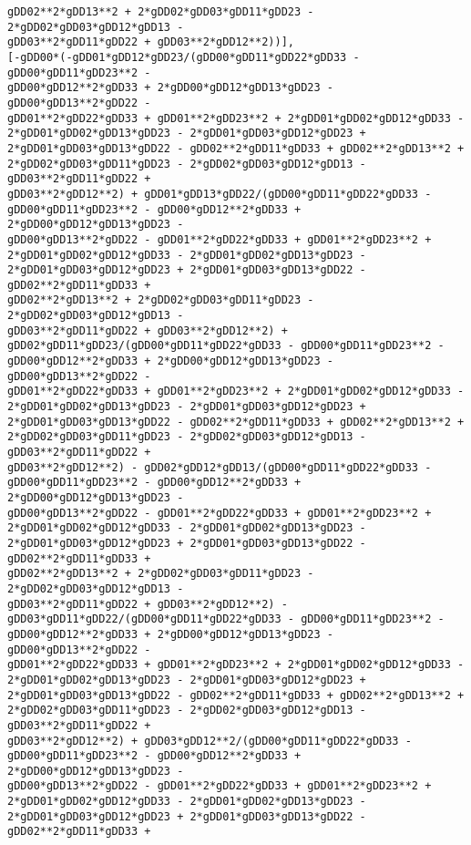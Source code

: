 \documentclass[landscape,letterpaper,10pt,english]{article}
\begin{document}
\begin{Verbatim}[commandchars=\\\{\}]
gDD02**2*gDD13**2 + 2*gDD02*gDD03*gDD11*gDD23 - 2*gDD02*gDD03*gDD12*gDD13 -
gDD03**2*gDD11*gDD22 + gDD03**2*gDD12**2))],
[-gDD00*(-gDD01*gDD12*gDD23/(gDD00*gDD11*gDD22*gDD33 - gDD00*gDD11*gDD23**2 -
gDD00*gDD12**2*gDD33 + 2*gDD00*gDD12*gDD13*gDD23 - gDD00*gDD13**2*gDD22 -
gDD01**2*gDD22*gDD33 + gDD01**2*gDD23**2 + 2*gDD01*gDD02*gDD12*gDD33 -
2*gDD01*gDD02*gDD13*gDD23 - 2*gDD01*gDD03*gDD12*gDD23 +
2*gDD01*gDD03*gDD13*gDD22 - gDD02**2*gDD11*gDD33 + gDD02**2*gDD13**2 +
2*gDD02*gDD03*gDD11*gDD23 - 2*gDD02*gDD03*gDD12*gDD13 - gDD03**2*gDD11*gDD22 +
gDD03**2*gDD12**2) + gDD01*gDD13*gDD22/(gDD00*gDD11*gDD22*gDD33 -
gDD00*gDD11*gDD23**2 - gDD00*gDD12**2*gDD33 + 2*gDD00*gDD12*gDD13*gDD23 -
gDD00*gDD13**2*gDD22 - gDD01**2*gDD22*gDD33 + gDD01**2*gDD23**2 +
2*gDD01*gDD02*gDD12*gDD33 - 2*gDD01*gDD02*gDD13*gDD23 -
2*gDD01*gDD03*gDD12*gDD23 + 2*gDD01*gDD03*gDD13*gDD22 - gDD02**2*gDD11*gDD33 +
gDD02**2*gDD13**2 + 2*gDD02*gDD03*gDD11*gDD23 - 2*gDD02*gDD03*gDD12*gDD13 -
gDD03**2*gDD11*gDD22 + gDD03**2*gDD12**2) +
gDD02*gDD11*gDD23/(gDD00*gDD11*gDD22*gDD33 - gDD00*gDD11*gDD23**2 -
gDD00*gDD12**2*gDD33 + 2*gDD00*gDD12*gDD13*gDD23 - gDD00*gDD13**2*gDD22 -
gDD01**2*gDD22*gDD33 + gDD01**2*gDD23**2 + 2*gDD01*gDD02*gDD12*gDD33 -
2*gDD01*gDD02*gDD13*gDD23 - 2*gDD01*gDD03*gDD12*gDD23 +
2*gDD01*gDD03*gDD13*gDD22 - gDD02**2*gDD11*gDD33 + gDD02**2*gDD13**2 +
2*gDD02*gDD03*gDD11*gDD23 - 2*gDD02*gDD03*gDD12*gDD13 - gDD03**2*gDD11*gDD22 +
gDD03**2*gDD12**2) - gDD02*gDD12*gDD13/(gDD00*gDD11*gDD22*gDD33 -
gDD00*gDD11*gDD23**2 - gDD00*gDD12**2*gDD33 + 2*gDD00*gDD12*gDD13*gDD23 -
gDD00*gDD13**2*gDD22 - gDD01**2*gDD22*gDD33 + gDD01**2*gDD23**2 +
2*gDD01*gDD02*gDD12*gDD33 - 2*gDD01*gDD02*gDD13*gDD23 -
2*gDD01*gDD03*gDD12*gDD23 + 2*gDD01*gDD03*gDD13*gDD22 - gDD02**2*gDD11*gDD33 +
gDD02**2*gDD13**2 + 2*gDD02*gDD03*gDD11*gDD23 - 2*gDD02*gDD03*gDD12*gDD13 -
gDD03**2*gDD11*gDD22 + gDD03**2*gDD12**2) -
gDD03*gDD11*gDD22/(gDD00*gDD11*gDD22*gDD33 - gDD00*gDD11*gDD23**2 -
gDD00*gDD12**2*gDD33 + 2*gDD00*gDD12*gDD13*gDD23 - gDD00*gDD13**2*gDD22 -
gDD01**2*gDD22*gDD33 + gDD01**2*gDD23**2 + 2*gDD01*gDD02*gDD12*gDD33 -
2*gDD01*gDD02*gDD13*gDD23 - 2*gDD01*gDD03*gDD12*gDD23 +
2*gDD01*gDD03*gDD13*gDD22 - gDD02**2*gDD11*gDD33 + gDD02**2*gDD13**2 +
2*gDD02*gDD03*gDD11*gDD23 - 2*gDD02*gDD03*gDD12*gDD13 - gDD03**2*gDD11*gDD22 +
gDD03**2*gDD12**2) + gDD03*gDD12**2/(gDD00*gDD11*gDD22*gDD33 -
gDD00*gDD11*gDD23**2 - gDD00*gDD12**2*gDD33 + 2*gDD00*gDD12*gDD13*gDD23 -
gDD00*gDD13**2*gDD22 - gDD01**2*gDD22*gDD33 + gDD01**2*gDD23**2 +
2*gDD01*gDD02*gDD12*gDD33 - 2*gDD01*gDD02*gDD13*gDD23 -
2*gDD01*gDD03*gDD12*gDD23 + 2*gDD01*gDD03*gDD13*gDD22 - gDD02**2*gDD11*gDD33 +

\end{Verbatim}
\end{document}
